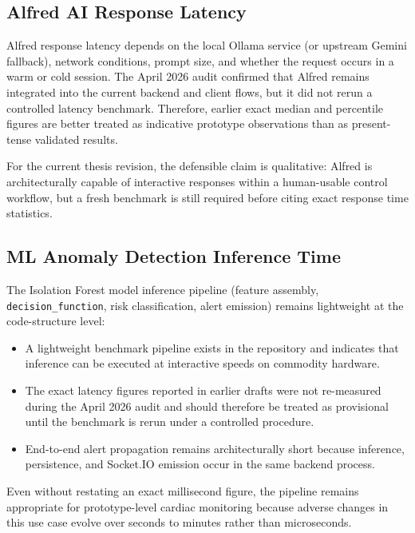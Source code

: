 \subsection{Alfred AI Response Latency}

Alfred response latency depends on the local Ollama service (or upstream Gemini fallback), network
conditions, prompt size, and whether the request occurs in a warm or cold
session. The April 2026 audit confirmed that Alfred remains integrated into the
current backend and client flows, but it did not rerun a controlled latency
benchmark. Therefore, earlier exact median and percentile figures are better
treated as indicative prototype observations than as present-tense validated
results.

For the current thesis revision, the defensible claim is qualitative: Alfred is
architecturally capable of interactive responses within a human-usable control
workflow, but a fresh benchmark is still required before citing exact response
time statistics.

\subsection{ML Anomaly Detection Inference Time}

The Isolation Forest model inference pipeline (feature assembly, \texttt{decision\_function},
risk classification, alert emission) remains lightweight at the code-structure level:

\begin{itemize}
    \item A lightweight benchmark pipeline exists in the repository and indicates that inference can be executed at interactive speeds on commodity hardware.
    \item The exact latency figures reported in earlier drafts were not re-measured during the April 2026 audit and should therefore be treated as provisional until the benchmark is rerun under a controlled procedure.
    \item End-to-end alert propagation remains architecturally short because inference, persistence, and Socket.IO emission occur in the same backend process.
\end{itemize}

Even without restating an exact millisecond figure, the pipeline remains appropriate
for prototype-level cardiac monitoring because adverse changes in this use case evolve
over seconds to minutes rather than microseconds.

